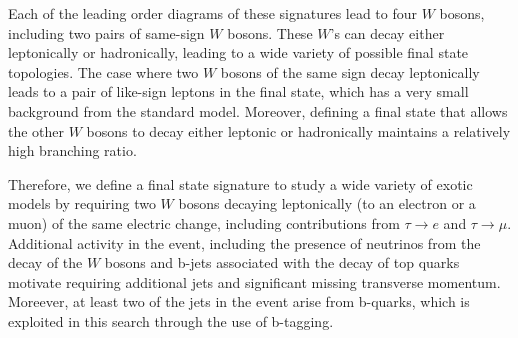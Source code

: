 
Each of the leading order diagrams of these signatures lead to four $W$ bosons, including two pairs of same-sign $W$ bosons.
These $W$'s can decay either leptonically or hadronically, leading to a wide variety of possible final state topologies.
The case where two $W$ bosons of the same sign decay leptonically leads to a pair of like-sign leptons in the final state, which has a very small background from the standard model.
Moreover, defining a final state that allows the other $W$ bosons to decay either leptonic or hadronically maintains a relatively high branching ratio.


Therefore, we define a final state signature to study a wide variety of exotic models by requiring two $W$ bosons decaying leptonically (to an electron or a muon) of the same electric change, including contributions from $\tau\rightarrow e$ and $\tau\rightarrow\mu$.
Additional activity in the event, including the presence of neutrinos from the decay of the $W$ bosons and b-jets associated with the decay of top quarks motivate requiring additional jets and significant missing transverse momentum.
Moreever, at least two of the jets in the event arise from b-quarks, which is exploited in this search through the use of b-tagging.


